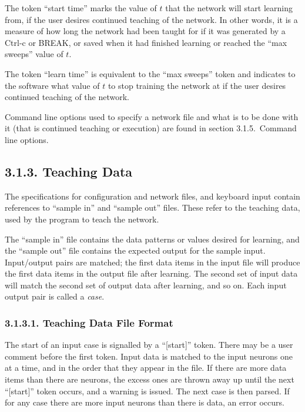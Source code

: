 \documentclass[12pt]{report}
\begin{document}
The token ``start time'' marks the value of $t$ that the network
will start learning from, if the user desires continued teaching of
the network.
In other words, it is a measure of how long the network had been
taught for if it was generated by a Ctrl-c or BREAK, or saved when
it had finished learning or reached the ``max sweeps'' value of
$t$.

The token ``learn time'' is equivalent to the ``max sweeps'' token
and indicates to the software what value of $t$ to stop 
training the network at if the user desires continued teaching of
the network.

Command line options used to specify a network file and what is to
be done with it (that is continued teaching or execution) are found
in section 3.1.5.~Command line options.

\subsection{3.1.3. Teaching Data}

The specifications for configuration and network files, and
keyboard input contain references to ``sample in'' and
``sample out'' files.
These refer to the teaching data, used by the program to teach the
network.

The ``sample in'' file contains the data patterns or values desired
for learning, and the ``sample out'' file contains the expected
output for the sample input.
Input/output pairs are matched; the first data items in the input
file will produce the first data items in the output file after
learning.
The second set of input data will match the second set
of output data after learning, and so on.
Each input output pair is called a {\sl case}.

\subsubsection{3.1.3.1. Teaching Data File Format}

The start of an input case is signalled by a ``[start]'' token.
There may be a user comment before the first token.
Input data is matched to the input neurons one at a time, and in the
order that they appear in the file.
If there are more data items than there are neurons, the excess ones
are thrown away up until the next ``[start]'' token occurs, and a
warning is issued.
The next case is then parsed.
If for any case there are more input neurons than there is data, an
error occurs.
\end{document}

